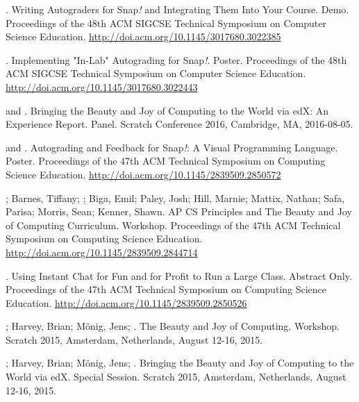 \begin{etaremune}
    \item{\me. Writing Autograders for Snap\textit{!} and Integrating Them Into Your Course. Demo. Proceedings of the 48th ACM SIGCSE Technical Symposium on Computer Science Education.} \href{http://doi.acm.org/10.1145/3017680.3022385}{http://doi.acm.org/10.1145/3017680.3022385}

    \item{\me. Implementing "In-Lab" Autograding for Snap\textit{!}. Poster. Proceedings of the 48th ACM SIGCSE Technical Symposium on Computer Science Education.} \newline\href{http://doi.acm.org/10.1145/3017680.3022443}{http://doi.acm.org/10.1145/3017680.3022443}
    

    \item{\dan and \me. Bringing the Beauty and Joy of Computing to the World via edX: An Experience Report. Panel. Scratch Conference 2016, Cambridge, MA, 2016-08-05.}

    \item{\me and \dan. Autograding and Feedback for Snap\textit{!}: A Visual Programming Language. Poster. Proceedings of the 47th ACM Technical Symposium on Computing Science Education.}
    \href{http://doi.acm.org/10.1145/2839509.2850572}{http://doi.acm.org/10.1145/2839509.2850572}

    \item{\dan; Barnes, Tiffany; \me; Biga, Emil; Paley, Josh; Hill, Marnie; Mattix, Nathan; Safa, Parisa; Morris, Sean; Kenner, Shawn. AP CS Principles and The Beauty and Joy of Computing Curriculum. Workshop. Proceedings of the 47th ACM Technical Symposium on Computing Science Education.} \href{http://doi.acm.org/10.1145/2839509.2844714}{http://doi.acm.org/10.1145/2839509.2844714}

    \item{\me. Using Instant Chat for Fun and for Profit to Run a Large Class. Abstract Only. Proceedings of the 47th ACM Technical Symposium on Computing Science Education.} \href{http://doi.acm.org/10.1145/2839509.2850526}{http://doi.acm.org/10.1145/2839509.2850526}
    

    \item{\dan; Harvey, Brian; Mönig, Jens; \me. The Beauty and Joy of Computing. Workshop. Scratch 2015, Amsterdam, Netherlands, August 12-16, 2015.}

    \item{\dan; Harvey, Brian; Mönig, Jens; \me. Bringing the Beauty and Joy of Computing to the World via edX. Special Session. Scratch 2015, Amsterdam, Netherlands, August 12-16, 2015.}


\end{etaremune}
